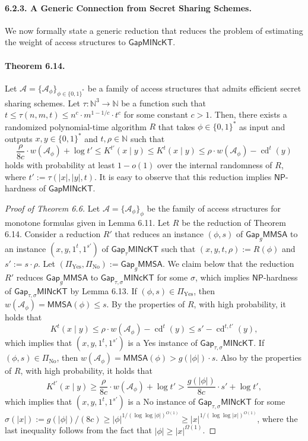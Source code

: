 \documentclass[10pt,a4paper]{article}
\begin{document}
\paragraph{6.2.3. A Generic Connection from Secret Sharing Schemes.}
We now formally state a generic reduction that reduces the problem of estimating the weight of access structures to $\mathsf{GapMINcKT}$.
\paragraph{Theorem 6.14.}
Let $\mathcal A=\{\mathcal A_\phi\}_{\phi\in\{0,1\}^*}$ be a family of access structures that admits efficient secret sharing schemes. Let $\tau:\mathbb N^3\to\mathbb N$ be a function such that $t\leq\tau(n,m,t)\leq n^c\cdot m^{1-1/c}\cdot t^c$ for some constant $c>1$. Then, there exists a randomized polynomial-time algorithm $R$ that takes $\phi\in\{0,1\}^*$ as input and outputs $x,y\in\{0,1\}^*$ and $t,\rho\in\mathbb N$ such that
\[\frac\rho{8c}\cdot w(\mathcal A_\phi)+\log t'\leq K^{t'}(x\mid y)\leq K^t(x\mid y)\leq\rho\cdot w(\mathcal A_\phi)-\operatorname{cd}^t(y)\]
holds with probability at least $1-o(1)$ over the internal randomness of $R$, where $t':=\tau(|x|,|y|,t)$.
It is easy to observe that this reduction implies $\mathsf{NP}$-hardness of $\mathsf{GapMINcKT}$.
\begin{proof}[Proof of Theorem 6.6]
Let $\mathcal A=\{\mathcal A_\phi\}_\phi$ be the family of access structures for monotone formulas given in Lemma 6.11. Let $R$ be the reduction of Theorem 6.14. Consider a reduction $R'$ that reduces an instance $(\phi,s)$ of $\mathsf{Gap}_g\mathsf{MMSA}$ to an instance $(x,y,1^t,1^{s'})$ of $\mathsf{Gap}_{\tau}\mathsf{MINcKT}$ such that $(x,y,t,\rho):=R(\phi)$ and $s':=s\cdot\rho$.
Let $(\Pi_{\mathrm{Yes}},\Pi_{\mathrm{No}}):=\mathsf{Gap}_g\mathsf{MMSA}$. We claim below that the reduction $R'$ reduces $\mathsf{Gap}_g\mathsf{MMSA}$ to $\mathsf{Gap}_{\tau,\sigma}\mathsf{MINcKT}$ for some $\sigma$, which implies $\mathsf{NP}$-hardness of $\mathsf{Gap}_{\tau,\sigma}\mathsf{MINcKT}$ by Lemma 6.13. If $(\phi,s)\in\Pi_{\mathrm{Yes}}$, then $w(\mathcal A_\phi)=\mathsf{MMSA}(\phi)\leq s$. By the properties of $R$, with high probability, it holds that
\[K^t(x\mid y)\leq\rho\cdot w(\mathcal A_\phi)-\operatorname{cd}^t(y)\leq s'-\operatorname{cd}^{t,t'}(y),\]
which implies that $(x,y,1^t,1^{s'})$ is a Yes instance of $\mathsf{Gap}_{\tau,\sigma}\mathsf{MINcKT}$. If $(\phi,s)\in\Pi_{\mathrm{No}}$, then $w(\mathcal A_\phi)=\mathsf{MMSA}(\phi)>g(|\phi|)\cdot s$. Also by the properties of $R$, with high probability, it holds that
\[K^{t'}(x\mid y)\geq\frac\rho{8c}\cdot w(\mathcal A_\phi)+\log t'>\frac{g(|\phi|)}{8c}\cdot s'+\log t',\]
which implies that $(x,y,1^t,1^{s'})$ is a No instance of $\mathsf{Gap}_{\tau,\sigma}\mathsf{MINcKT}$ for some $\sigma(|x|):=g(|\phi|)/(8c)\geq|\phi|^{1/(\log\log|\phi|)^{O(1)}}\geq|x|^{1/(\log\log|x|)^{O(1)}}$, where the last inequality follows from the fact that $|\phi|\geq|x|^{\Omega(1)}$.
\end{proof}
\end{document}
